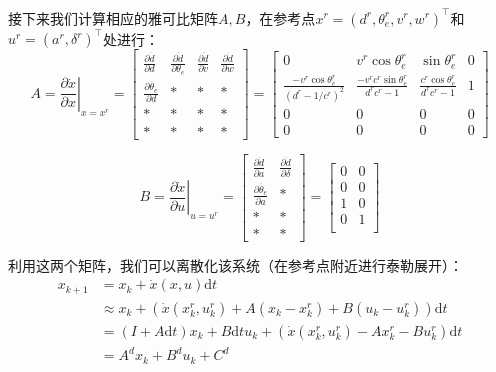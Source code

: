 接下来我们计算相应的雅可比矩阵$A, B$，在参考点$x^r = (d^r, \theta_e^r, v^r, w^r)^\top$和$u^r = (a^r, \delta^r)^\top$处进行：
\begin{equation}
    A = \left. \frac{\partial{\dot{x}}}{\partial{x}} \right|_{x = x^r}
    = 
    \begin{bmatrix}
        \frac{\partial{\dot{d}}}{\partial{d}} & \frac{\partial{\dot{d}}}{\partial{\theta_e}} & 
        \frac{\partial{\dot{d}}}{\partial{v}} & \frac{\partial{\dot{d}}}{\partial{w}} \\
        \frac{\partial{\dot{\theta_e}}}{\partial{d}} & * & * & * \\
        * & * & * & * \\
        * & * & * & * 
    \end{bmatrix} = 
    \begin{bmatrix}
        0 & v^r \cos \theta_e^r & \sin \theta_e^r & 0 \\
        \frac{-v^r \cos \theta_e^r}{(d^r - 1/c^r)^2} & \frac{-v^r c^r \sin \theta_e^r}{d^r c^r-1} & \frac{c^r \cos \theta_e^r}{d^r c^r - 1} & 1 \\
        0 & 0 & 0 & 0 \\
        0 & 0 & 0 & 0
    \end{bmatrix}
\end{equation}

\begin{equation}
    B = \left. \frac{\partial{\dot{x}}}{\partial{u}} \right|_{u = u^r}
    = 
    \begin{bmatrix}
        \frac{\partial{\dot{d}}}{\partial{a}} & \frac{\partial{\dot{d}}}{\partial{\delta}} \\
        \frac{\partial{\dot{\theta_e}}}{\partial{a}} & * \\
        * & * \\
        * & *  
    \end{bmatrix} = 
    \begin{bmatrix}
        0 & 0 \\
        0 & 0 \\
        1 & 0 \\
        0 & 1 \\
    \end{bmatrix}
\end{equation}

利用这两个矩阵，我们可以离散化该系统（在参考点附近进行泰勒展开）：
\begin{equation}
    \begin{aligned}
        x_{k+1} &= x_k + \dot{x}(x, u) \mathrm{d}t \\
        & \approx x_k + (\dot{x}(x_k^r, u_k^r) + A(x_k - x_k^r) + B(u_k - u_k^r)) \mathrm{d}t \\
        & = (I + A \mathrm{d}t) x_k + B \mathrm{d}t u_k + (\dot{x}(x_k^r, u_k^r) - A x_k^r - B u_k^r) \mathrm{d}t \\
        & = A^d x_k + B^d u_k + C^d
    \end{aligned}
\end{equation}

